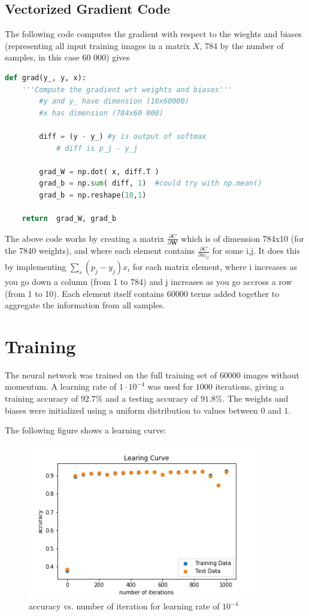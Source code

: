 \documentclass{article}
\begin{document}
   \subsection{Vectorized Gradient Code}
   The following code computes the gradient with respect to the wieghts and biases
   (representing all input training images in a matrix $X$, 784 by the number of samples, in this case 60 000) gives
      \begin{lstlisting}[language=Python]
         def grad(y_, y, x):
	'''Compute the gradient wrt weights and biases'''
    	#y and y_ have dimension (10x60000)
    	#x has dimension (784x60 000)
    
    	diff = (y - y_) #y is output of softmax
        	# diff is p_j - y_j
    
    	grad_W = np.dot( x, diff.T )
    	grad_b = np.sum( diff, 1)  #could try with np.mean()
    	grad_b = np.reshape(10,1)
    
    return  grad_W, grad_b
      \end{lstlisting}

   The above code works  by creating a matrix  $\frac{ \partial C}{ \partial \textbf{W} }$ which is of dimension 784x10 
  (for the 7840 weights), and where each element contains $\frac{ \partial C}{ \partial w_{ij} }$ for some i,j.
  It does this by implementing $\sum_s ( p_j - y_j ) x_i$ for each matrix element, where i increases as you go down
  a column (from 1 to 784) and j increases as you go accross a row (from 1 to 10). Each element itself contains 60000
  terms added together to aggregate the information from all samples.

   \section{Training}
   The neural network was trained on the full training set of $60000$ images without momentum.
   A learning rate of $1 \cdot 10^{-4}$ was used for $1000$ iterations, giving a training accuracy of $92.7\%$
   and a testing accuracy of $91.8\%$.
   The weights and biases were initialized using a uniform distribution to values between $0$ and $1$.

   The following figure shows a learning curve:
  \begin{figure}[H] \centering
      \includegraphics[width=4in]{resources/part4}
      \caption{accuracy vs. number of iteration for learning rate of $10^{-4}$}
   \end{figure}
\end{document}
